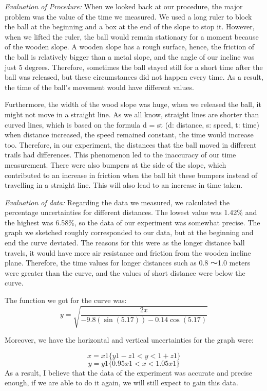\documentclass[12pt]{report}
\begin{document}
\emph{Evaluation of Procedure:}
When we looked back at our procedure, the major problem was the value of the time we measured. We used a long ruler to block the ball at the beginning and a box at the end of the slope to stop it. However, when we lifted the ruler, the ball would remain stationary for a moment because of the wooden slope. A wooden slope has a rough surface, hence, the friction of the ball is relatively bigger than a metal slope, and the angle of our incline was just 5 degrees. Therefore, sometimes the ball stayed still for a short time after the ball was released, but these circumstances did not happen every time. As a result, the time of the ball’s movement would have different values.

Furthermore, the width of the wood slope was huge, when we released the ball, it might not move in a straight line. As we all know, straight lines are shorter than curved lines, which is based on the formula d = st (d: distance, s: speed, t: time) when distance increased, the speed remained constant, the time would increase too. Therefore, in our experiment, the distances that the ball moved in different trails had differences. This phenomenon led to the inaccuracy of our time measurement. There were also bumpers at the side of the slope, which contributed to an increase in friction when the ball hit these bumpers instead of travelling in a straight line. This will also lead to an increase in time taken.

\emph{Evaluation of data:}
Regarding the data we measured, we calculated the percentage uncertainties for different distances. The lowest value was 1.42\% and the highest was 6.58\%, so the data of our experiment was somewhat precise. The graph we sketched roughly corresponded to our data, but at the beginning and end the curve deviated. The reasons for this were as the longer distance ball travels, it would have more air resistance and friction from the wooden incline plane. Therefore, the time values for longer distances such as 0.8 ～1.0 meters were greater than the curve, and the values of short distance were below the curve.

The function we got for the curve was:
\[ y = \sqrt{\frac{2x}{-9.8(\sin(5.17))-0.14\cos(5.17)}}\]

Moreover, we have the horizontal and vertical uncertainties for the graph were:

\[x = x{1}\{y{1}-z{1}<y<{1}+z{1}\}\]
\[y = y{1}\{0.95x{1}<x<1.05x{1}\}\]
As a result, I believe that the data of the experiment was accurate and precise enough, if we are able to do it again, we will still expect to gain this data.
\end{document}
